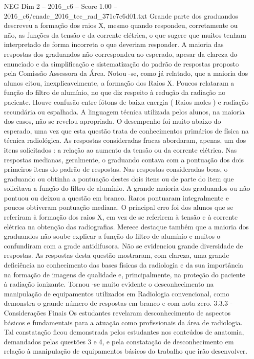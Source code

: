 \begin{textsample}{NEG Dim 2 – 2016\_c6 – Score 1.00 – 2016\_c6/enade\_2016\_tec\_rad\_371c7e6d01.txt}
Grande parte dos graduandos descreveu a formação dos raios X, mesmo quando respondeu, corretamente ou não, as funções da tensão e da corrente elétrica, o que sugere que muitos tenham interpretado de forma incorreta o que deveriam responder.
A maioria das respostas dos graduandos não correspondeu ao esperado, apesar da clareza do enunciado e da simplificação e sistematização do padrão de respostas proposto pela Comissão Assessora da Área.
Notou -se, como já relatado, que a maioria dos alunos citou, inexplicavelmente, a formação dos Raios X.
Poucos relataram a função do filtro de alumínio, no que diz respeito à redução da radiação no paciente.
Houve confusão entre fótons de baixa energia ( Raios moles ) e radiação secundária ou espalhada.
A linguagem técnica utilizada pelos alunos, na maioria dos casos, não se revelou apropriada.
O desempenho foi muito abaixo do esperado, uma vez que esta questão trata de conhecimentos primários de física na técnica radiológica.
As respostas consideradas fracas abordaram, apenas, um dos itens solicitados : a relação ao aumento da tensão ou da corrente elétrica.
Nas respostas medianas, geralmente, o graduando contava com a pontuação dos dois primeiros itens do padrão de respostas.
Nas respostas consideradas boas, o graduando ou obtinha a pontuação destes dois itens ou de parte do item que solicitava a função do filtro de alumínio.
A grande maioria dos graduandos ou não pontuou ou deixou a questão em branco.
Raros pontuaram integralmente e poucos obtiveram pontuação mediana.
O principal erro foi dos alunos que se referiram à formação dos raios X, em vez de se referirem à tensão e à corrente elétrica na obtenção das radiografias.
Merece destaque também que a maioria dos graduandos não soube explicar a função do filtro de alumínio e muitos o confundiram com a grade antidifusora.
Não se evidenciou grande diversidade de respostas.
As respostas desta questão mostraram, com clareza, uma grande deficiência no conhecimento das bases físicas da radiologia e da sua importância na formação de imagens de qualidade e, principalmente, na proteção do paciente à radiação ionizante.
Tornou -se muito evidente o desconhecimento na manipulação de equipamentos utilizados em Radiologia convencional, como demonstra o grande número de respostas em branco e com nota zero. 3.3.3 - Considerações Finais Os estudantes revelaram desconhecimento de aspectos básicos e fundamentais para a atuação como profissionais da área de radiologia.
Tal constatação ficou demonstrada pelos estudantes nos conteúdos de anatomia, demandados pelas questões 3 e 4, e pela constatação de desconhecimento em relação à manipulação de equipamentos básicos do trabalho que irão desenvolver.

\end{textsample}
